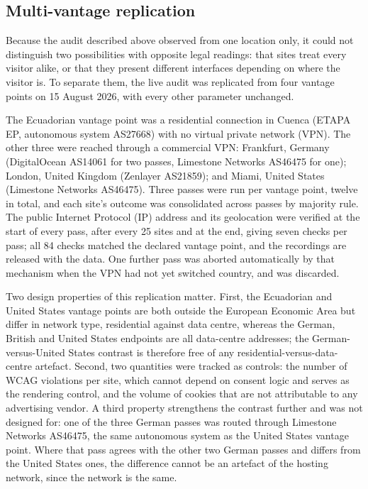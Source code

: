 \documentclass[pdflatex,sn-basic,Numbered,iicol]{sn-jnl}
\theoremstyle{thmstyleone}
\theoremstyle{thmstyletwo}
\theoremstyle{thmstylethree}
\begin{document}
\subsection{Multi-vantage replication}\label{sec:methods-vantage}

Because the audit described above observed from one location only, it could not distinguish two possibilities with opposite legal readings: that sites treat every visitor alike, or that they present different interfaces depending on where the visitor is. To separate them, the live audit was replicated from four vantage points on 15 August 2026, with every other parameter unchanged.

The Ecuadorian vantage point was a residential connection in Cuenca (ETAPA EP, autonomous system AS27668) with no virtual private network (VPN). The other three were reached through a commercial VPN: Frankfurt, Germany (DigitalOcean AS14061 for two passes, Limestone Networks AS46475 for one); London, United Kingdom (Zenlayer AS21859); and Miami, United States (Limestone Networks AS46475). Three passes were run per vantage point, twelve in total, and each site's outcome was consolidated across passes by majority rule. The public Internet Protocol (IP) address and its geolocation were verified at the start of every pass, after every 25 sites and at the end, giving seven checks per pass; all 84 checks matched the declared vantage point, and the recordings are released with the data. One further pass was aborted automatically by that mechanism when the VPN had not yet switched country, and was discarded.

Two design properties of this replication matter. First, the Ecuadorian and United States vantage points are both outside the European Economic Area but differ in network type, residential against data centre, whereas the German, British and United States endpoints are all data-centre addresses; the German-versus-United States contrast is therefore free of any residential-versus-data-centre artefact. Second, two quantities were tracked as controls: the number of WCAG violations per site, which cannot depend on consent logic and serves as the rendering control, and the volume of cookies that are not attributable to any advertising vendor. A third property strengthens the contrast further and was not designed for: one of the three German passes was routed through Limestone Networks AS46475, the same autonomous system as the United States vantage point. Where that pass agrees with the other two German passes and differs from the United States ones, the difference cannot be an artefact of the hosting network, since the network is the same.
\end{document}
